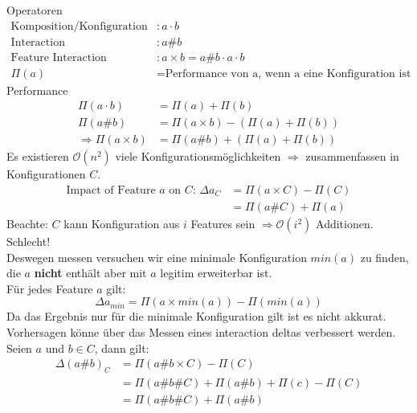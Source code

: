 \documentclass{article}
\begin{document}
Operatoren
\begin{align*}
\text{Komposition/Konfiguration} &:  a \cdot b\\
\text{Interaction} &: a\#b\\
\text{Feature Interaction} &: a\times b = a\#b \cdot a \cdot b\\
\Pi(a)  &= \text{Performance von a, wenn a eine Konfiguration ist} 
\end{align*}
Performance
\begin{align*}
	\Pi(a \cdot b) &= \Pi(a) + \Pi(b)\\
	\Pi(a\#b) &= \Pi(a \times b) - (\Pi(a) + \Pi(b))\\
	\Rightarrow \Pi(a \times b) &=  \Pi(a\#b) + (\Pi(a) + \Pi(b))
\end{align*}
	Es existieren $\mathcal{O}(n^2)$ viele Konfigurationsmöglichkeiten $\Rightarrow$ zusammenfassen in Konfigurationen $C$.
\begin{align*}
\text{Impact  of Feature $a$ on $C$: } \Delta a_C &= \Pi(a \times C) - \Pi(C)\\
&= \Pi(a\#C) + \Pi(a)
\end{align*}
Beachte: $C$ kann Konfiguration aus $i$ Features sein $\Rightarrow \mathcal{O}(i^2)$ Additionen. Schlecht!\\ 
	Deswegen messen versuchen wir eine minimale Konfiguration  $min(a)$  zu finden, die $a$ \textbf{nicht} enthält aber mit $a$ legitim erweiterbar ist.\\
	Für jedes Feature $a$ gilt:
	\begin{equation*}
	\Delta a_{min} = \Pi(a \times min(a)) - \Pi(min(a))
	\end{equation*}
	Da das Ergebnis nur für die minimale Konfiguration gilt ist es nicht akkurat.
	Vorhersagen könne über das Messen eines interaction deltas verbessert werden.
	Seien $a$ und $b \in C$, dann gilt: 
	\begin{equation*}
	\begin{split}
	\Delta (a\#b)_C &= \Pi(a\#b \times C ) - \Pi(C)\\
					&= \Pi(a\#b\#C ) + \Pi(a\#b) + \Pi(c)  - \Pi(C)\\
					&= \Pi(a\#b\#C ) + \Pi(a\#b)
	\end{split}
	\end{equation*}
	
\end{document}
